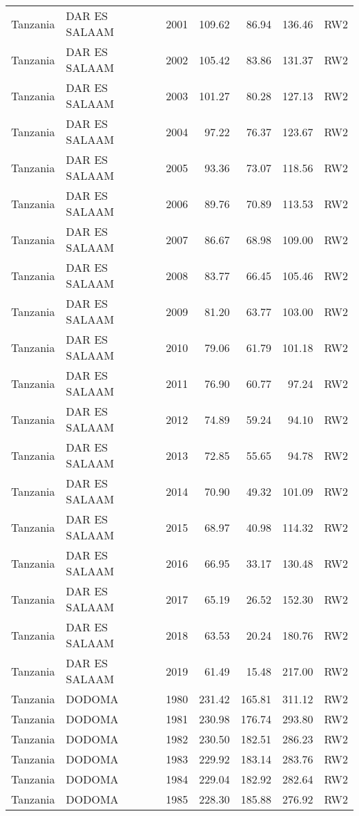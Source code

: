 \begin{longtable}{lllrrrl}
  Tanzania & DAR ES SALAAM & 2001 & 109.62 & 86.94 & 136.46 & RW2 \\ 
  Tanzania & DAR ES SALAAM & 2002 & 105.42 & 83.86 & 131.37 & RW2 \\ 
  Tanzania & DAR ES SALAAM & 2003 & 101.27 & 80.28 & 127.13 & RW2 \\ 
  Tanzania & DAR ES SALAAM & 2004 & 97.22 & 76.37 & 123.67 & RW2 \\ 
  Tanzania & DAR ES SALAAM & 2005 & 93.36 & 73.07 & 118.56 & RW2 \\ 
  Tanzania & DAR ES SALAAM & 2006 & 89.76 & 70.89 & 113.53 & RW2 \\ 
  Tanzania & DAR ES SALAAM & 2007 & 86.67 & 68.98 & 109.00 & RW2 \\ 
  Tanzania & DAR ES SALAAM & 2008 & 83.77 & 66.45 & 105.46 & RW2 \\ 
  Tanzania & DAR ES SALAAM & 2009 & 81.20 & 63.77 & 103.00 & RW2 \\ 
  Tanzania & DAR ES SALAAM & 2010 & 79.06 & 61.79 & 101.18 & RW2 \\ 
  Tanzania & DAR ES SALAAM & 2011 & 76.90 & 60.77 & 97.24 & RW2 \\ 
  Tanzania & DAR ES SALAAM & 2012 & 74.89 & 59.24 & 94.10 & RW2 \\ 
  Tanzania & DAR ES SALAAM & 2013 & 72.85 & 55.65 & 94.78 & RW2 \\ 
  Tanzania & DAR ES SALAAM & 2014 & 70.90 & 49.32 & 101.09 & RW2 \\ 
  Tanzania & DAR ES SALAAM & 2015 & 68.97 & 40.98 & 114.32 & RW2 \\ 
  Tanzania & DAR ES SALAAM & 2016 & 66.95 & 33.17 & 130.48 & RW2 \\ 
  Tanzania & DAR ES SALAAM & 2017 & 65.19 & 26.52 & 152.30 & RW2 \\ 
  Tanzania & DAR ES SALAAM & 2018 & 63.53 & 20.24 & 180.76 & RW2 \\ 
  Tanzania & DAR ES SALAAM & 2019 & 61.49 & 15.48 & 217.00 & RW2 \\ 
  Tanzania & DODOMA & 1980 & 231.42 & 165.81 & 311.12 & RW2 \\ 
  Tanzania & DODOMA & 1981 & 230.98 & 176.74 & 293.80 & RW2 \\ 
  Tanzania & DODOMA & 1982 & 230.50 & 182.51 & 286.23 & RW2 \\ 
  Tanzania & DODOMA & 1983 & 229.92 & 183.14 & 283.76 & RW2 \\ 
  Tanzania & DODOMA & 1984 & 229.04 & 182.92 & 282.64 & RW2 \\ 
  Tanzania & DODOMA & 1985 & 228.30 & 185.88 & 276.92 & RW2 \\ 

\end{longtable}
